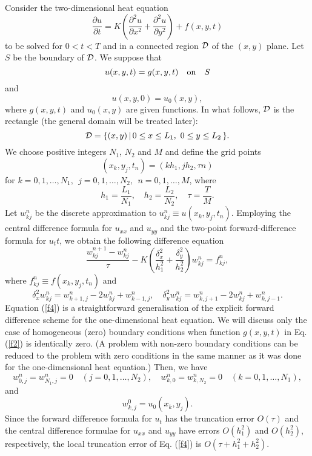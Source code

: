 Consider the two-dimensional heat equation
\begin{equation}
\frac{\partial u}{\partial t}=K\left(\frac{\partial^{2}u}{\partial
x^{2}} +\frac{\partial^{2}u}{\partial y^{2}}\right)+f(x,y,t) \label{f1}
\end{equation}
to be solved for $0 < t < T$ and in a connected region ${\cal D}$ of
the $(x, y)$ plane. Let $S$ be the boundary of ${\cal D}$. We
suppose that
\begin{equation}
u(x, y, t) = g(x, y, t) \quad {\rm on} \quad S \label{f2}
\end{equation}
and
\begin{equation}
u(x, y, 0) = u_{0}(x, y), \label{f3}
\end{equation}
where $g(x, y, t)$ and $ u_{0}(x, y)$ are given functions.
In what follows, ${\cal D}$ is the rectangle (the general domain
will be treated later):
\[
{\cal D}=\{(x,y) \, \vert \, 0\leq x\leq L_{1}, \ 0\leq y\leq L_{2}  \, \}.
\]
We choose positive integers $N_{1}$, $N_{2}$ and
$M$ and define the grid points
\[
(x_{k},y_{j},t_{n})=(kh_{1},jh_{2}, \tau n)
\]
for $k=0,1,\dots, N_{1}, \ \ j=0,1,\dots, N_{2}, \ \ n=0,1,\dots, M$,
where
\[
h_{1}=\frac{L_{1}}{N_{1}}, \quad h_{2}=\frac{L_{2}}{N_{2}}, \quad
\tau=\frac{T}{M}.
\]
Let $w_{kj}^{n}$ be the discrete approximation to
$u_{kj}^n\equiv u(x_{k},y_{j},t_{n})$. Employing the central
difference formula for $u_{xx}$ and $u_{yy}$
and the two-point forward-difference formula for $u_tt$, we
obtain the following difference equation
\begin{equation}
\frac{w_{kj}^{n+1}-w_{kj}^{n}}{\tau} -K\left(\frac{\delta_{x}^2}{h_{1}^2}
+\frac{\delta_{y}^2}{h_{2}^2}\right)w_{kj}^{n}=f_{kj}^n, \label{f4}
\end{equation}
where $f_{kj}^n\equiv f(x_{k},y_{j},t_{n})$ and
\[
\delta_{x}^2w_{kj}^{n}=w_{k+1,j}^{n}-2w_{kj}^{n}+w_{k-1,j}^{n}, \quad
\delta_{y}^2w_{kj}^{n}=w_{k,j+1}^{n}-2w_{kj}^{n}+w_{k,j-1}^{n}.
\]
Equation (\ref{f4})
is a straightforward generalisation of the explicit forward difference
scheme for the one-dimensional heat equation. We will discuss only
the case of homogeneous (zero) boundary conditions when function
$g(x,y,t)$ in Eq. (\ref{f2}) is identically zero. (A problem with
non-zero boundary conditions can be reduced to the problem with
zero conditions in the same manner as it was done for the one-dimensional
heat equation.) Then, we have
\begin{equation}
w_{0,j}^{n}=w^{n}_{N_{1},j}=0 \quad
(j=0,1,\dots, N_{2}), \quad
w^{n}_{k,0}=w^{n}_{k,N_{2}}=0 \quad
(k=0,1,\dots, N_{1}), \label{f5}
\end{equation}
and
\begin{equation}
w^{0}_{k,j}=u_{0}(x_{k},y_{j}). \label{f6}
\end{equation}
Since the forward difference formula for $u_t$ has the truncation error
$O(\tau)$ and the central
difference formulae for
$u_{xx}$ and $u_{yy}$ have errors $O(h_{1}^2)$ and $O(h_{2}^2)$, respectively, the
local truncation error of Eq. (\ref{f4}) is $O(\tau+h_{1}^2+h_{2}^2)$.

